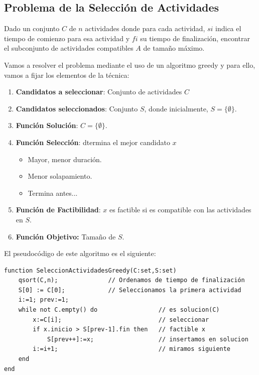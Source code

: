 \documentclass[10pt,a4paper,spanish]{report}
\theoremstyle{definition}
\theoremstyle{remark}
\begin{document}
\subsection{\textcolor{electriccrimson}Problema de la Selección de Actividades}

Dado un conjunto $C$ de $n$ actividades donde para cada actividad, $si$ indica el tiempo de comienzo para esa actividad y $fi$ su tiempo de finalización, encontrar el subconjunto de actividades compatibles $A$ de tamaño máximo.

Vamos a resolver el problema mediante el uso de un algoritmo greedy y para ello, vamos a fijar los elementos de la técnica:

\begin{enumerate}[---]
    \item \textbf{\textcolor{electriccrimson}{Candidatos a seleccionar}}: Conjunto de actividades $C$
    \item \textbf{\textcolor{electriccrimson}{Candidatos seleccionados}}: Conjunto $S$, donde inicialmente, $S = \{\emptyset\}$.
    \item \textbf{\textcolor{electriccrimson}{Función Solución}}: $C=\{\emptyset\}$.
    \item \textbf{\textcolor{electriccrimson}{Función Selección}}: dtermina el mejor candidato $x$
    \begin{itemize}
        \item Mayor, menor duración.
        \item Menor solapamiento.
        \item Termina antes...
    \end{itemize}
    \item \textbf{\textcolor{electriccrimson}{Función de Factibilidad}}: $x$ es factible si es compatible con las actividades en $S$.
    \item \textbf{\textcolor{electriccrimson}{Función Objetivo:}} Tamaño de $S$.
\end{enumerate}

El pseudocódigo de este algoritmo es el siguiente:

\begin{verbatim}
function SeleccionActividadesGreedy(C:set,S:set)
    qsort(C,n);              // Ordenamos de tiempo de finalización
    S[0] := C[0];            // Seleccionamos la primera actividad
    i:=1; prev:=1;
    while not C.empty() do                 // es solucion(C)
        x:=C[i];                           // seleccionar
        if x.inicio > S[prev-1].fin then   // factible x
            S[prev++]:=x;                  // insertamos en solucion
        i:=i+1;                            // miramos siguiente
    end
end
\end{verbatim}
\end{document}
